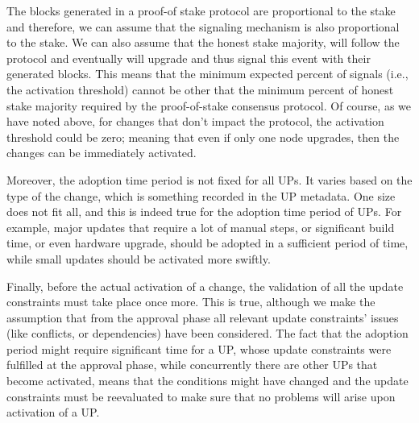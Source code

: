 The blocks generated in a proof-of stake protocol are proportional to the stake and therefore, we can assume that the signaling mechanism is also proportional to the stake. We can also assume that the honest stake majority, will follow the protocol and eventually will upgrade and thus signal this event with their generated blocks. This means that the minimum expected percent of signals (i.e., the activation threshold) cannot be other that the minimum percent of honest stake majority required by the proof-of-stake consensus protocol. Of course, as we have noted above, for changes that don't impact the protocol, the activation threshold could be zero; meaning that even if only one node upgrades, then the changes can be immediately activated.

Moreover, the adoption time period is not fixed for all UPs. It varies based on the type of the change, which is something recorded in the UP metadata. One size does not fit all, and this is indeed true for the adoption time period of UPs. For example, major updates that require a lot of manual steps, or significant build time, or even hardware upgrade, should be adopted in a sufficient period of time, while small updates should be activated more swiftly.

Finally, before the actual activation of a change, the validation of all the update constraints must take place once more. This is true, although we make the assumption that from the approval phase all relevant update constraints' issues (like conflicts, or dependencies) have been considered. The fact that the adoption period might require significant time for a UP, whose update constraints were fulfilled at the approval phase, while concurrently there are other UPs that become activated, means that the conditions might have changed and the update constraints must be reevaluated to make sure that no problems will arise upon activation of a UP.


